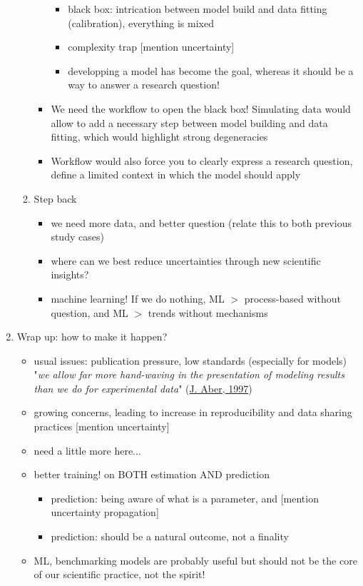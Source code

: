\documentclass[11pt]{article}
\begin{document}
\begin{enumerate}
\begin{enumerate}
\begin{itemize}
\begin{itemize}
\item black box: intrication between model build and data fitting (calibration), everything is mixed 
\item complexity trap [mention uncertainty]
\item developping a model has become the goal, whereas it should be a way to answer a research question!
\end{itemize}
\item We need the workflow to open the black box! Simulating data would allow to add a necessary step between model building and data fitting, which would highlight strong degeneracies
\item Workflow would also force you to clearly express a research question, define a limited context in which the model should apply
\end{itemize}
\item Step back
\begin{itemize}
\item we need more data, and better question (relate this to both previous study cases)
\item where can we best reduce uncertainties through new scientific insights?
\item machine learning! If we do nothing, ML $>$ process-based without question, and ML $>$ trends without mechanisms
\end{itemize}
\end{enumerate}
\item Wrap up: how to make it happen?
\begin{itemize}
\item usual issues: publication pressure, low standards (especially for models)\\
"\emph{we allow far more hand-waving in the presentation of modeling results than we do for experimental data}" (\href{https://harvardforest1.fas.harvard.edu/publications/pdfs/Aber_BulletinEcoSocAmerica_1997.pdf}{J. Aber, 1997})
\item growing concerns, leading to increase in reproducibility and data sharing practices [mention uncertainty]
\item need a little more here...
\item better training! on BOTH estimation AND prediction
\begin{itemize}
\item prediction: being aware of what is a parameter, and [mention uncertainty propagation]
\item prediction: should be a natural outcome, not a finality
\end{itemize}
\item ML, benchmarking models are probably useful but should not be the core of our scientific practice, not the spirit!
\end{itemize}
\end{enumerate}
\end{document}
